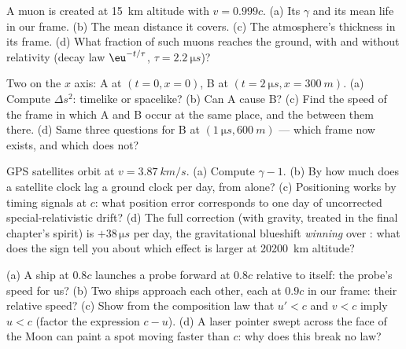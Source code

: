 \begin{exercise}[$\star$]\label{exo:b3:relativistic-kinematics:3}
A muon is created at \qty{15}{km} altitude with $v = 0.999c$. (a) Its
$\gamma$ and its mean life in our frame. (b) The mean distance it
covers. (c) The atmosphere's thickness in its frame. (d) What fraction
of such muons reaches the ground, with and without relativity (decay
law $\eu^{-t/\tau}$, $\tau = \qty{2.2}{\micro s}$)?
\end{exercise}

\begin{exercise}[$\star$]\label{exo:b3:relativistic-kinematics:4}
Two  on the $x$ axis: A at $(t = 0, x = 0)$, B at $(t =
\qty{2}{\micro s}, x = \qty{300}{m})$. (a) Compute $\Delta s^2$:
timelike or spacelike? (b) Can A cause B? (c) Find the speed of the
frame in which A and B occur at the same place, and the 
between them there. (d) Same three questions for B at
$(\qty{1}{\micro s}, \qty{600}{m})$ --- which frame now exists, and
which does not?
\end{exercise}

\begin{exercise}[$\star\star$]\label{exo:b3:relativistic-kinematics:5}
GPS satellites orbit at $v = \qty{3.87}{km/s}$. (a) Compute $\gamma -
1$. (b) By how much does a satellite clock lag a ground clock per day,
from  alone? (c) Positioning works by timing signals at
$c$: what position error corresponds to one day of uncorrected
special-relativistic drift? (d) The full correction (with gravity,
treated in the final chapter's spirit) is $+38\,\unit{\micro s}$ per
day, the gravitational blueshift \emph{winning} over :
what does the sign tell you about which effect is larger at
\qty{20200}{km} altitude?
\end{exercise}

\begin{exercise}[$\star\star$]\label{exo:b3:relativistic-kinematics:6}
(a) A ship at $0.8c$ launches a probe forward at $0.8c$ relative to
itself: the probe's speed for us? (b) Two ships approach each other,
each at $0.9c$ in our frame: their relative speed? (c) Show from the
composition law that $u' < c$ and $v < c$ imply $u < c$ (factor the
expression $c - u$). (d) A laser pointer swept across the face of the
Moon can paint a spot moving faster than $c$: why does this break no
law?
\end{exercise}

